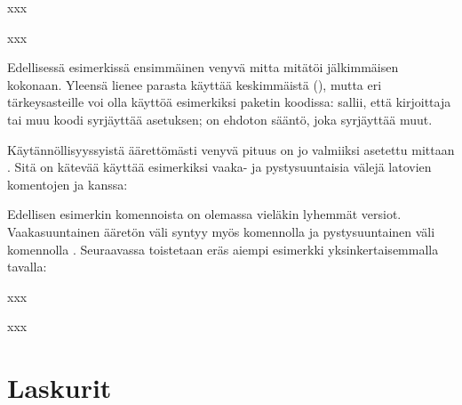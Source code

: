 \begin{koodilohkosis}
x\hspace{0mm plus 1filll}x\hspace{0mm plus 1fill}x
\end{koodilohkosis}

\begin{tulossis}
  x\hspace{0mm plus 1filll}x\hspace{0mm plus 1fill}x
\end{tulossis}

\noindent
Edellisessä esimerkissä ensimmäinen venyvä mitta  mitätöi
jälkimmäisen  kokonaan. Yleensä lienee parasta käyttää
keskimmäistä (), mutta eri tärkeysasteille voi olla käyttöä
esimerkiksi paketin koodissa:  sallii, että kirjoittaja
tai muu koodi syrjäyttää asetuksen;  on ehdoton sääntö,
joka syrjäyttää muut.

Käytännöllisyyssyistä äärettömästi venyvä pituus 
on jo valmiiksi asetettu mittaan . Sitä on kätevää käyttää
esimerkiksi vaaka- ja pystysuuntaisia välejä latovien komentojen
 ja  kanssa:

\begin{koodilohkosis}
\hspace{\fill} %
\vspace{\fill} %
\end{koodilohkosis}

\noindent
Edellisen esimerkin komennoista on olemassa vieläkin lyhemmät versiot.
Vaakasuuntainen ääretön väli syntyy myös komennolla  ja
pystysuuntainen väli komennolla . Seuraavassa toistetaan
eräs aiempi esimerkki yksinkertaisemmalla tavalla:

\begin{koodilohkosis}
x\hfill x\hfill\hfill x
\end{koodilohkosis}

\begin{tulossis}
  x\hfill x\hfill\hfill x
\end{tulossis}

\section{Laskurit}
\label{luku/laskurit}

